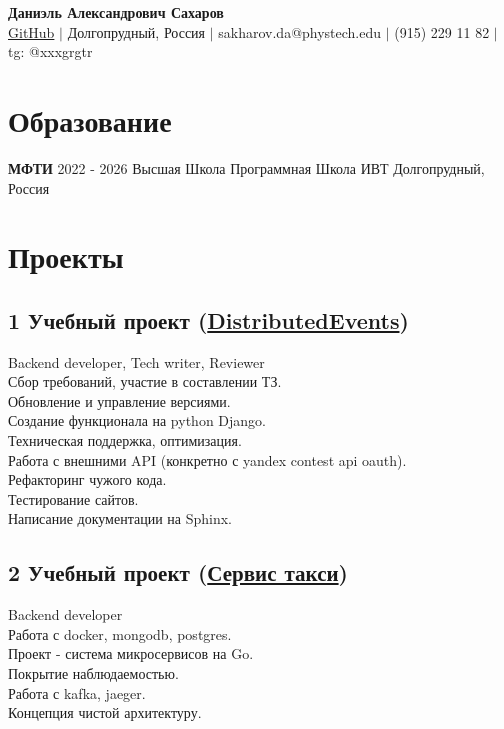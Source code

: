 \documentclass[a4paper,10pt]{article}
\begin{document}
\begin{center}
    \textbf{\LARGE Даниэль Александрович Сахаров} \\
    \vspace{5pt}
    \href{https://github.com/grgtr}{GitHub} $\vert$
    Долгопрудный, Россия $\vert$ 
    sakharov.da@phystech.edu $\vert$ 
    (915) 229 11 82 $\vert$ 
    tg: @xxxgrgtr
\end{center}

\section*{Образование}
\noindent
\textbf{МФТИ} \hfill 2022 - 2026
Высшая Школа Программная Школа ИВТ Долгопрудный, Россия

\section*{Проекты}
\noindent
\subsection*{1 Учебный проект (\href{https://github.com/hsse-distributed-events-team/devents-second-semester}{DistributedEvents})}
Backend developer, Tech writer,
Reviewer \\  
Сбор требований, участие в составлении ТЗ. \\
Обновление и управление версиями. \\
Создание функционала на python Django. \\
Техническая поддержка, оптимизация. \\
Работа с внешними API (конкретно с yandex contest api oauth). \\
Рефакторинг чужого кода. \\
Тестирование сайтов. \\
Написание документации на Sphinx.

\subsection*{2 Учебный проект (\href{https://github.com/VS-CDR/final-project_hsse}{Сервис такси})}
Backend developer \\
Работа с docker, mongodb, postgres. \\
Проект - система микросервисов на Go. \\
Покрытие наблюдаемостью. \\
Работа с kafka, jaeger. \\
Концепция чистой архитектуру.
\end{document}
